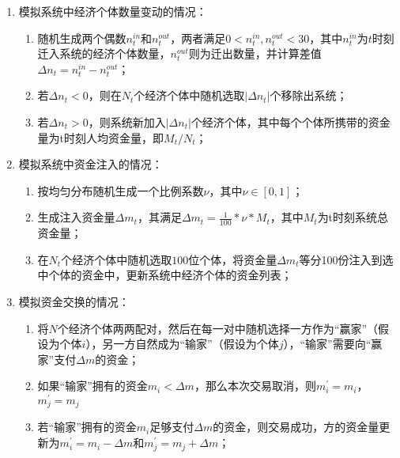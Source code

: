 \documentclass[tsinghuacite]{HustGraduPaper}
\begin{document}
			\begin{enumerate}
		
			\item 模拟系统中经济个体数量变动的情况：
			
				\begin{enumerate}[label=(\roman*)]
				
				\item 随机生成两个偶数$n_{t}^{in}$和$n_{t}^{out}$，两者满足$0<n_{t}^{in}, n_{t}^{out}<30$，其中$n_{t}^{in}$为$t$时刻迁入系统的经济个体数量，$n_{t}^{out}$则为迁出数量，并计算差值$\Delta n_{t} = n_{t}^{in} - n_{t}^{out}$；
				
				\item 若$\Delta n_{t} < 0$，则在$N_t$个经济个体中随机选取$ \lvert \Delta n_{t} \rvert $个移除出系统；
				
				\item 若$\Delta n_{t} > 0$，则系统新加入$\lvert \Delta n_{t} \rvert $个经济个体，其中每个个体所携带的资金量为t时刻人均资金量，即$M_t / N_t$；
				
				\end{enumerate}
			
			\item 模拟系统中资金注入的情况：
			
				\begin{enumerate}[label=(\roman*)]
			
				\item 按均匀分布随机生成一个比例系数$\nu$，其中$\nu \in [0,1]$；
				
				\item 生成注入资金量$\Delta m_t$，其满足$\Delta m_t =  \frac{1}{100} * \nu * M_t $，其中$M_t$为t时刻系统总资金量；
				
				\item 在$N_t$个经济个体中随机选取$100$位个体，将资金量$\Delta m_t$等分100份注入到选中个体的资金中，更新系统中经济个体的资金列表；
				
				\end{enumerate}
			
			\item 模拟资金交换的情况：
			
				\begin{enumerate}[label=(\roman*)]
				
				\item 将$N$个经济个体两两配对，然后在每一对中随机选择一方作为“赢家”（假设为个体$i$），另一方自然成为“输家”（假设为个体$j$），“输家”需要向“赢家”支付$\Delta m$的资金；
				
				\item 如果“输家”拥有的资金$m_{i} < \Delta m$，那么本次交易取消，则$m_i^{'} = m_i$，$m_j^{'} = m_j$
								
				\item 若“输家”拥有的资金$m_i$足够支付$\Delta m$的资金，则交易成功，方的资金量更新为$m_i^{'} = m_i - \Delta m$和$m_j^{'} = m_j + \Delta m$；
				
				\end{enumerate}
			
			\end{enumerate}
		
\end{document}
